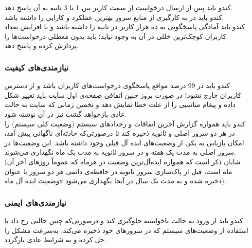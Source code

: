 \documentclass{report}
\begin{document}
\begin{adjustwidth}{2em}{0pt}
کندو باید پس از ارسال درخواست از سمت کاربر بین 1 تا 3 ثانیه به آن پاسخ دهد.
\\                                                                                                                                                                                                                         
کندو باید در به کارگیری از منابع سرور بهترین عملکرد و کارایی را داشته باشد.
\\                                                                                                                                                                                                                         
کندو باید آمادگی پاسخگویی به ده هزار کاربر در ثانیه را داشته باشد و با افزایش تعداد کاربران کوچک‌ترین خللی در آن به وجود نیاید؛ باید بدون معطلی درخواست‌ها را پردازش کرده و پاسخ دهد.
\\
\end{adjustwidth}
\subsubsection*{نیازمندی‌های کیفیت}
\begin{adjustwidth}{2em}{0pt}
کندو باید در 99 درصد مواقع پاسخگوی درخواست‌های کاربران باشد و از دسترس کاربران خارج نشود؛ در صورت بروز چنین اتفاقی صفحه‌ی اول سایت باید تغییر شکل داده و پیغام مناسبی را از علت خطا نمایش دهد و تخمین زمانی که سایت به حالت عادی بازخواهد گشت نیز در آن نوشته شود.
\\
کندو باید همواره گزارش آخرین اتفاقات و رخدادهای سیستم (وضعیت کلی سیستم) را در هر دو سرور اصلی و ثانویه ذخیره کند تا درصورتی‌که حادثه‌ای ناگهانی پیش آمد، امکان بازیابی به یکی از وضعیت‌های ایده آل قبلی وجود داشته باشد. این وضعیت‌ها در سرور اصلی به مدت یک هفته و در سرور ثانویه به مدت یک ماه نگهداری می‌شوند. (شایان ذکر است که همواره ایده‌آل‌ترین وضعیت در هرماه که عموماً روزهای آخر آن ماه است، قبل از پاک‌سازی سرور ثانویه در حافظه‌ی دائمی هر دو سرور با عنوان وضعیت ایده آل ماهx  ذخیره شده و به مدت یک سال در آنجا نگهداری می‌شود).
\\
\end{adjustwidth}

\subsubsection*{نیازمندی‌های ایمنی}
\begin{adjustwidth}{2em}{0pt}
کندو باید از ورود به حالت ناخواسته جلوگیری کند و درصورتی‌که چنین حالتی رخ داد با استفاده از وضعیت‌های سیستم که در سرورهای خود ذخیره می‌کند، به‌سرعت مشکل را حل کرده و به شرایط عادی بازگردد.
\\
\end{adjustwidth}
\end{document}
